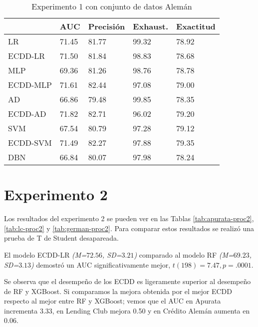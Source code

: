 \begin{table}[]
\centering
\caption{Experimento 1 con conjunto de datos Alemán}
\label{tab:german-proc1}
\begin{tabularx}{0.75\textwidth}{|l|Y Y Y Y|}
				\hline
				& AUC		& Precisión	& Exhaust.		& Exactitud	\\
				\hline
LR				& 71.45		& 81.77		& 99.32			& 78.92		\\		%
ECDD-LR			& 71.50		& 81.84		& 98.83			& 78.68		\\		%
				\hline
MLP				& 69.36		& 81.26		& 98.76			& 78.78		\\		%
ECDD-MLP		& 71.61		& 82.44		& 97.08			& 79.00		\\		%
				\hline
AD				& 66.86		& 79.48		& 99.85			& 78.35		\\		%
ECDD-AD			& 71.82		& 82.71		& 96.02			& 79.20		\\		%
				\hline
SVM				& 67.54		& 80.79		& 97.28			& 79.12		\\		%
ECDD-SVM		& 71.49		& 82.27		& 97.88			& 79.35		\\		%
				\hline
DBN				& 66.84		& 80.07		& 97.98			& 78.24		\\		%
				\hline
\end{tabularx}
\end{table}


\section{Experimento 2} %

Los resultados del experimento 2 se pueden ver en las Tablas \ref{tab:apurata-proc2}, \ref{tab:lc-proc2} y \ref{tab:german-proc2}. Para comparar estos resultados se realizó una prueba de T de Student desapareada.

El modelo ECDD-LR \textit{(M=$72.56$, SD=$3.21$)} comparado al modelo \ac{RF} \textit{(M=$69.23$, SD=$3.13$)} demostró un \ac{AUC} significativamente mejor, $t(198)=7.47, p=.0001$.

Se observa que el desempeño de los \ac{ECDD} es ligeramente superior al desempeño de \ac{RF} y \ac{XGBoost}. Si comparamos la mejora obtenida por el mejor \ac{ECDD} respecto al mejor entre RF y XGBoost; vemos que el AUC en Apurata incrementa 3.33, en Lending Club mejora 0.50 y en Crédito Alemán aumenta en 0.06.

